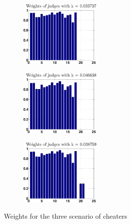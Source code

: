 \documentclass[12pt,a4paper]{article}
\begin{document}
\begin{figure}
\begin{subfigure}[b]{0.32\textwidth}
\includegraphics[width = 4cm]{cheaters/chweightsStupid.eps}
\end{subfigure}
\begin{subfigure}[b]{0.32\textwidth}
\includegraphics[width = 4cm]{cheaters/chweightsSmart.eps}
\end{subfigure}
\begin{subfigure}[b]{0.32\textwidth}
\includegraphics[width = 4cm]{cheaters/chweightsMix.eps}
\end{subfigure}
\caption{Weights for the three scenario of cheaters\label{weightch}}
\end{figure}
\end{document}
